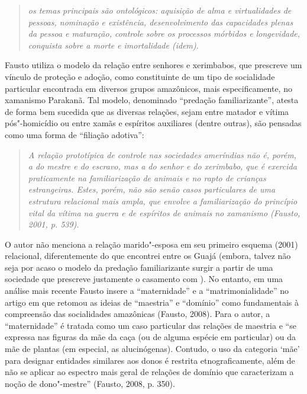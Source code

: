 \begin{quote}
\emph{os temas principais são ontológicos: aquisição de alma e virtualidades
de pessoas, nominação e existência, desenvolvimento das capacidades
plenas da pessoa e maturação, controle sobre os processos mórbidos e
longevidade, conquista sobre a morte e imortalidade (\emph{idem})}.
\end{quote}

Fausto utiliza o modelo da relação entre senhores e xerimbabos, que
prescreve um vínculo de proteção e adoção, como constituinte de um tipo
de socialidade particular encontrada em diversos grupos amazônicos, mais
especificamente, no xamanismo Parakanã. Tal modelo, denominado
``predação familiarizante'', atesta de forma bem sucedida que as
diversas relações, sejam entre matador e vítima pós"-homicídio ou entre
xamãs e espíritos auxiliares (dentre outras), são pensadas como uma
forma de ``filiação adotiva'':

\begin{quote}
\emph{A relação prototípica de controle nas sociedades ameríndias não é,
porém, a do mestre e do escravo, mas a do senhor e do xerimbabo, que é
exercida praticamente na familiarização de animais e no rapto de
crianças estrangeiras. Estes, porém, não são senão casos particulares de
uma estrutura relacional mais ampla, que envolve a familiarização do
princípio vital da vítima na guerra e de espíritos de animais no
xamanismo (Fausto, 2001, p. 539)}.
\end{quote}

O autor não menciona a relação marido"-esposa em seu primeiro esquema
(2001) relacional, diferentemente do que encontrei entre os Guajá
(embora, talvez não seja por acaso o modelo da predação familiarizante
surgir a partir de uma sociedade que prescreve justamente o casamento
com ). No entanto, em uma análise mais recente Fausto insere a
``maternidade'' e a ``matrimonialidade'' no artigo em que retomou as ideias
de ``maestria'' e ``domínio'' como fundamentais à compreensão das
socialidades amazônicas (Fausto, 2008). Para o autor, a ``maternidade'' é
tratada como um caso particular das relações de maestria e ``se expressa
nas figuras da mãe da caça (ou de alguma espécie em particular) ou da
mãe de plantas (em especial, as alucinógenas). Contudo, o uso da
categoria `mãe' para designar entidades similares aos donos é restrita
etnograficamente, além de não se aplicar ao espectro mais geral de
relações de domínio que caracterizam a noção de dono"-mestre'' (Fausto,
2008, p. 350).

